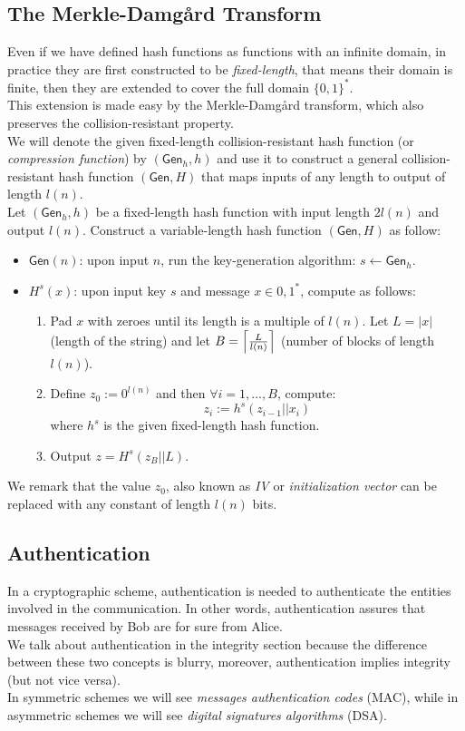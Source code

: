 \subsection{The Merkle-Damg\r{a}rd Transform}\label{sec:merkledamgard}
Even if we have defined hash functions as functions with an infinite domain, in practice they are first constructed to be \emph{fixed-length}, that means their domain is finite, then they are extended to cover the full domain $\{0,1\}^{*}$.\\
This extension is made easy by the Merkle-Damg\r{a}rd transform, which also preserves the collision-resistant property.\\
We will denote the given fixed-length collision-resistant hash function (or \emph{compression function}) by $(\mathsf{Gen}_h, h)$ and use it to construct a general collision-resistant hash function $(\mathsf{Gen}, H)$ that maps inputs of any length to output of length $l(n)$.\\
Let $(\mathsf{Gen}_h, h)$ be a fixed-length hash function with input length $2l(n)$ and output $l(n)$. Construct a variable-length hash function $(\mathsf{Gen}, H)$ as follow:
\begin{itemize}
    \item{$\mathsf{Gen}(n)$: upon input $n$, run the key-generation algorithm: $s \leftarrow \mathsf{Gen}_h$.}
    \item{$H^s(x)$: upon input key $s$ and message $x \in {0, 1}^{*}$, compute as follows:
        \begin{enumerate}
            \item{Pad $x$ with zeroes until its length is a multiple of $l(n)$. Let $L = |x|$ (length of the string) and let $B = \ceil[\Big]{\frac{L}{l(n)}}$ (number of blocks of length $l(n)$).}
            \item{Define $z_0 := 0^{l(n)}$ and then $\forall i = 1,...,B$, compute:
                $$
                    z_i := h^s(z_{i-1}||x_i)
                $$
                where $h^s$ is the given fixed-length hash function.}
            \item{Output $z = H^s(z_B||L)$.}
        \end{enumerate}}
\end{itemize}
We remark that the value $z_0$, also known as \emph{IV} or \emph{initialization vector} can be replaced with any constant of length $l(n)$ bits.

\subsection{Authentication}
In a cryptographic scheme, authentication is needed to authenticate the entities involved in the communication. In other words, authentication assures that messages received by Bob are for sure from Alice.\\
We talk about authentication in the integrity section because the difference between these two concepts is blurry, moreover, authentication implies integrity (but not vice versa).\\
In symmetric schemes we will see \emph{messages authentication codes} (MAC), while in asymmetric schemes we will see \emph{digital signatures algorithms} (DSA).

